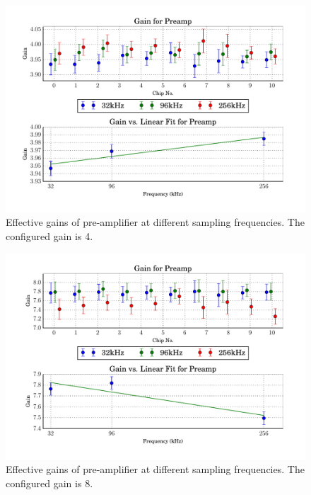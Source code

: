 \begin{figure}
    \centering
    \includegraphics[width=\linewidth]{images/plots/dc_slope_preamp_gain+4.pdf}
    \caption{Effective gains of pre-amplifier at different sampling frequencies. The configured gain is 4.}
    \label{fig:preamp_slope+4}
\end{figure}
\begin{figure}
    \centering
    \includegraphics[width=\linewidth]{images/plots/dc_slope_preamp_gain+8.pdf}
    \caption{Effective gains of pre-amplifier at different sampling frequencies. The configured gain is 8.}
    \label{fig:preamp_slope+8}
\end{figure}
